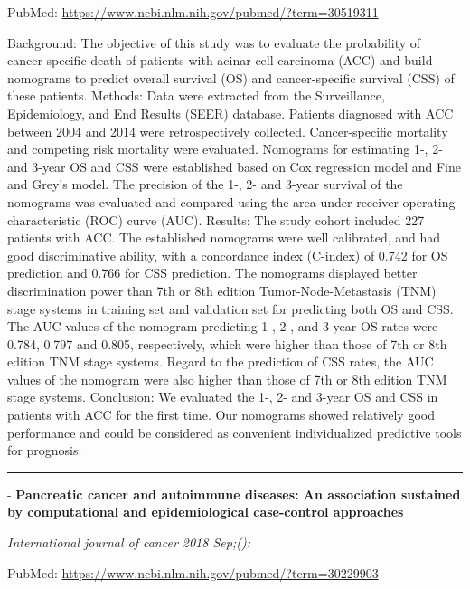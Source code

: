 \documentclass[]{article}
\begin{document}
PubMed: \url{https://www.ncbi.nlm.nih.gov/pubmed/?term=30519311}

Background: The objective of this study was to evaluate the probability
of cancer-specific death of patients with acinar cell carcinoma (ACC)
and build nomograms to predict overall survival (OS) and cancer-specific
survival (CSS) of these patients. Methods: Data were extracted from the
Surveillance, Epidemiology, and End Results (SEER) database. Patients
diagnosed with ACC between 2004 and 2014 were retrospectively collected.
Cancer-specific mortality and competing risk mortality were evaluated.
Nomograms for estimating 1-, 2- and 3-year OS and CSS were established
based on Cox regression model and Fine and Grey's model. The precision
of the 1-, 2- and 3-year survival of the nomograms was evaluated and
compared using the area under receiver operating characteristic (ROC)
curve (AUC). Results: The study cohort included 227 patients with ACC.
The established nomograms were well calibrated, and had good
discriminative ability, with a concordance index (C-index) of 0.742 for
OS prediction and 0.766 for CSS prediction. The nomograms displayed
better discrimination power than 7th or 8th edition
Tumor-Node-Metastasis (TNM) stage systems in training set and validation
set for predicting both OS and CSS. The AUC values of the nomogram
predicting 1-, 2-, and 3-year OS rates were 0.784, 0.797 and 0.805,
respectively, which were higher than those of 7th or 8th edition TNM
stage systems. Regard to the prediction of CSS rates, the AUC values of
the nomogram were also higher than those of 7th or 8th edition TNM stage
systems. Conclusion: We evaluated the 1-, 2- and 3-year OS and CSS in
patients with ACC for the first time. Our nomograms showed relatively
good performance and could be considered as convenient individualized
predictive tools for prognosis.

{}

{}

\begin{center}\rule{0.5\linewidth}{\linethickness}\end{center}

 - \textbf{Pancreatic cancer and autoimmune diseases: An association
sustained by computational and epidemiological case-control approaches}

\emph{International journal of cancer 2018 Sep;():}

PubMed: \url{https://www.ncbi.nlm.nih.gov/pubmed/?term=30229903}
\end{document}
